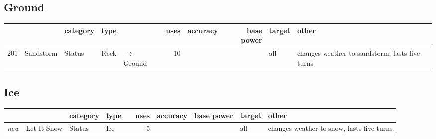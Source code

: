 \documentclass{article}
\begin{document}
\begin{landscape}
\normalsize
\subsection{Ground}
\small
\begin{longtable}{rl|l|ll|rrr|l|l}
 &  & category & type &  & uses & accuracy & base power & target & other \\
\hline
201 & Sandstorm & Status & Rock & $\rightarrow$ Ground & 10 &  &  & all & changes weather to sandstorm, lasts five turns \\
\end{longtable}

\normalsize
\subsection{Ice}
\small
\begin{longtable}{rl|l|ll|rrr|l|l}
 &  & category & type &  & uses & accuracy & base power & target & other \\
\hline
\emph{new} & Let It Snow & Status & Ice &  & 5 &  &  & all & changes weather to snow, lasts five turns \\
\end{longtable}

\normalsize

\end{landscape}
\end{document}
